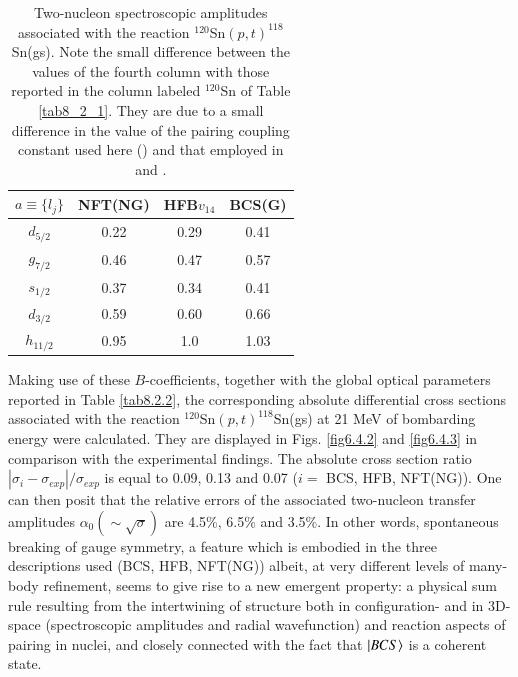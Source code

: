 \begin{table}
\begin{center}
\begin{tabular}{|c|c|c|c|}
\hline
$a\equiv\{l_j\}$ & NFT(NG)  & HFB$v_{14}$  & BCS(G)  \\ 
 \hline 
$d_{5/2}$ & 0.22 & 0.29 & 0.41 \\ 
\hline 
$g_{7/2}$ & 0.46 & 0.47 &  0.57\\ 
 \hline
$s_{1/2}$ & 0.37 & 0.34 & 0.41 \\ 
 \hline
$d_{3/2}$ & 0.59 & 0.60 & 0.66 \\ 
 \hline
$h_{11/2}$ & 0.95 & 1.0 & 1.03\\
 \hline
\end{tabular}
\end{center}
\caption{Two-nucleon spectroscopic amplitudes associated with the reaction $^{120}$Sn$(p,t)^{118}$Sn(gs). Note the small difference between the values of the fourth column with those reported in the column labeled $^{120}$Sn of Table \ref{tab8_2_1}. They are due to a small difference in the value of the pairing coupling constant used here  (\cite{Potel:17}) and that employed in \cite{Potel:17} and \cite{Potel:13b}. }\label{tab6.4.3}
\end{table} 
Making use of these $B$-coefficients, together with the global optical parameters reported in Table \ref{tab8.2.2}, the corresponding absolute differential cross sections associated with the reaction $^{120}$Sn$(p,t)^{118}$Sn(gs) at 21 MeV of bombarding energy were calculated.  They are displayed in Figs. \ref{fig6.4.2} and \ref{fig6.4.3} in comparison with the experimental findings.  The absolute cross section ratio $|\sigma_i-\sigma_{exp}|/\sigma_{exp}$ is equal to 0.09, 0.13 and 0.07 ($i=$ BCS, HFB, NFT(NG)). One can then posit that the relative errors of the associated two-nucleon transfer amplitudes $\alpha_0(\sim\sqrt{\sigma})$ are 4.5\%, 6.5\% and 3.5\%. In other words, spontaneous breaking of gauge symmetry, a feature which is embodied in the three descriptions used (BCS, HFB, NFT(NG)) albeit, at very different levels of many-body refinement, seems to give rise to a new emergent property: a physical sum rule resulting from the intertwining of structure both in configuration- and in 3D-space (spectroscopic amplitudes and radial wavefunction) and reaction aspects of pairing in nuclei, and closely connected with the fact that $|{BCS} \rangle$ is a coherent state. 

